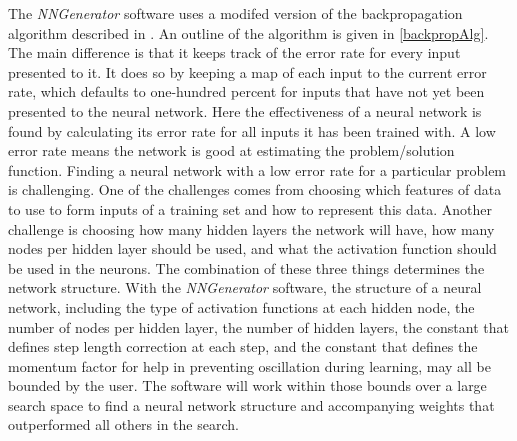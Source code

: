 The {\it NNGenerator} software uses a modifed version of the
backpropagation algorithm described in \cite{rojas3}.
An outline of the algorithm is given in \ref{backpropAlg}.
The main difference is that it keeps track of the error rate for every
input presented to it.
It does so by keeping a map of each input to the current error rate,
which defaults to one-hundred percent for inputs that have not yet
been presented to the neural network.
Here the effectiveness of a neural network is found by calculating
its error rate for all inputs it has been trained with. 
A low error rate means the network is good at estimating the
problem/solution function. 
Finding a neural network with a low error rate for a particular
problem is challenging. 
One of the challenges comes from choosing which features of data to
use to form inputs of a training set and how to represent this data. 
Another challenge is choosing how many hidden layers the network will
have, how many nodes per hidden layer should be used, and what the
activation function should be used in the neurons. 
The combination of these three things determines the network structure. 
With the {\it NNGenerator} software, the structure of a neural
network, including the type of activation functions at each hidden
node, the number of nodes per hidden layer, the number of hidden
layers, the constant that defines step length correction at each step,
and the constant that defines the momentum factor for help in
preventing oscillation during learning, may all be bounded by the
user.
The software will work within those bounds over a large search space
to find a neural network structure and accompanying weights that
outperformed all others in the search.
